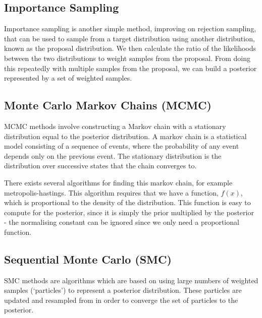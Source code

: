 \subsection{Importance Sampling}

Importance sampling is another simple method, improving on rejection sampling, that can be used to sample from a target distribution using another distribution, known as the proposal distribution. We then calculate the ratio of the likelihoods between the two distributions to weight samples from the proposal. From doing this repeatedly with multiple samples from the proposal, we can build a posterior represented by a set of weighted samples.


\subsection{Monte Carlo Markov Chains (MCMC)}

MCMC methods involve constructing a Markov chain with a stationary distribution equal to the posterior distribution. A markov chain is a statistical model consisting of a sequence of events, where the probability of any event depends only on the previous event. The stationary distribution is the distribution over successive states that the chain converges to.

There exists several algorithms for finding this markov chain, for example metropolis-hastings. This algorithm requires that we have a function, $f(x)$, which is proportional to the density of the distribution. This function is easy to compute for the posterior, since it is simply the prior multiplied by the posterior - the normalising constant can be ignored since we only need a proportional function.

\subsection{Sequential Monte Carlo (SMC)}

SMC methods are algorithms which are based on using large numbers of weighted samples (`particles') to represent a posterior distribution. These particles are updated and resampled from in order to converge the set of particles to the posterior.

